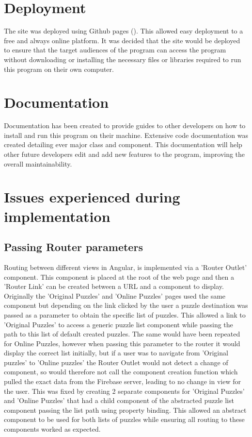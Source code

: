 \documentclass{l4proj}
\begin{document}
\section{Deployment}
The site was deployed using Github pages (\cite{soloproject}). This allowed easy deployment to a free and always online platform. It was decided that the site would be deployed to ensure that the target audiences of the program can access the program without downloading or installing the necessary files or libraries required to run this program on their own computer. 

\section{Documentation}
Documentation has been created to provide guides to other developers on how to install and run this program on their machine. Extensive code documentation was created detailing ever major class and component. This documentation will help other future developers edit and add new features to the program, improving the overall maintainability.


\section{Issues experienced during implementation}
\subsection{Passing Router parameters}
\label{section:issues}
Routing between different views in Angular, is implemented via a 'Router Outlet' component. This component is placed at the root of the web page and then a 'Router Link' can be created between a URL and a component to display. Originally the 'Original Puzzles' and 'Online Puzzles' pages used the same component but depending on the link clicked by the user a puzzle destination was passed as a parameter to obtain the specific list of puzzles. This allowed a link to 'Original Puzzles' to access a generic puzzle list component while passing the path to this list of default created puzzles. The same would have been repeated for Online Puzzles, however when passing this parameter to the router it would display the correct list initially, but if a user was to navigate from 'Original puzzles' to 'Online puzzles' the Router Outlet would not detect a change of component, so would therefore not call the component creation function which pulled the exact data from the Firebase server, leading to no change in view for the user. This was fixed by creating 2 separate components for 'Original Puzzles' and 'Online Puzzles' that had a child component of the abstracted puzzle list component passing the list path using property binding. This allowed an abstract component to be used for both lists of puzzles while ensuring all routing to these components worked as expected.  
\end{document}
